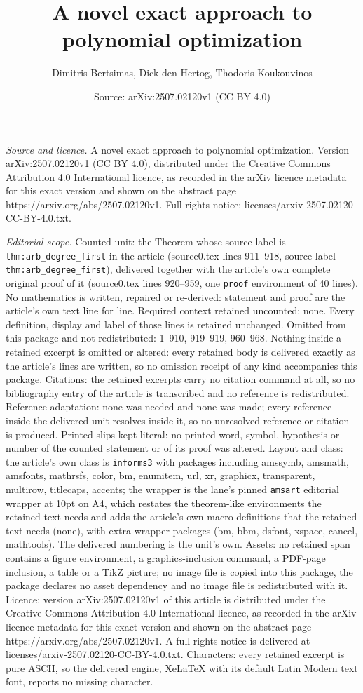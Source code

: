 \documentclass[10pt,a4paper]{amsart}
\title[A novel exact approach to polynomial optimization]{A novel exact approach to polynomial optimization}
\author{Dimitris Bertsimas, Dick den Hertog, Thodoris Koukouvinos}
\date{Source: arXiv:2507.02120v1 (CC BY 4.0)}
\begin{document}
\maketitle

\noindent\emph{Source and licence.} A novel exact approach to polynomial optimization. Version arXiv:2507.02120v1 (CC BY 4.0), distributed under the Creative Commons Attribution 4.0 International licence, as recorded in the arXiv licence metadata for this exact version and shown on the abstract page https://arxiv.org/abs/2507.02120v1. Full rights notice: licenses/arxiv-2507.02120-CC-BY-4.0.txt.\par\smallskip

\noindent\textit{Editorial scope.} Counted unit: the Theorem whose source label is \texttt{thm:arb\_degree\_first} in the article (source0.tex lines 911--918, source label \texttt{thm:arb\_degree\_first}), delivered together with the article's own complete original proof of it (source0.tex lines 920--959, one \texttt{proof} environment of 40 lines). No mathematics is written, repaired or re-derived: statement and proof are the article's own text line for line. Required context retained uncounted: none. Every definition, display and label of those lines is retained unchanged. Omitted from this package and not redistributed: 1--910, 919--919, 960--968. Nothing inside a retained excerpt is omitted or altered: every retained body is delivered exactly as the article's lines are written, so no omission receipt of any kind accompanies this package. Citations: the retained excerpts carry no citation command at all, so no bibliography entry of the article is transcribed and no reference is redistributed. Reference adaptation: none was needed and none was made; every reference inside the delivered unit resolves inside it, so no unresolved reference or citation is produced. Printed slips kept literal: no printed word, symbol, hypothesis or number of the counted statement or of its proof was altered. Layout and class: the article's own class is \texttt{informs3} with packages including amssymb, amsmath, amsfonts, mathrsfs, color, bm, enumitem, url, xr, graphicx, transparent, multirow, titlecaps, accents; the wrapper is the lane's pinned \texttt{amsart} editorial wrapper at 10pt on A4, which restates the theorem-like environments the retained text needs and adds the article's own macro definitions that the retained text needs (none), with extra wrapper packages (bm, bbm, dsfont, xspace, cancel, mathtools). The delivered numbering is the unit's own. Assets: no retained span contains a figure environment, a graphics-inclusion command, a PDF-page inclusion, a table or a TikZ picture; no image file is copied into this package, the package declares no asset dependency and no image file is redistributed with it. Licence: version arXiv:2507.02120v1 of this article is distributed under the Creative Commons Attribution 4.0 International licence, as recorded in the arXiv licence metadata for this exact version and shown on the abstract page https://arxiv.org/abs/2507.02120v1. A full rights notice is delivered at licenses/arxiv-2507.02120-CC-BY-4.0.txt. Characters: every retained excerpt is pure ASCII, so the delivered engine, XeLaTeX with its default Latin Modern text font, reports no missing character.
\end{document}

